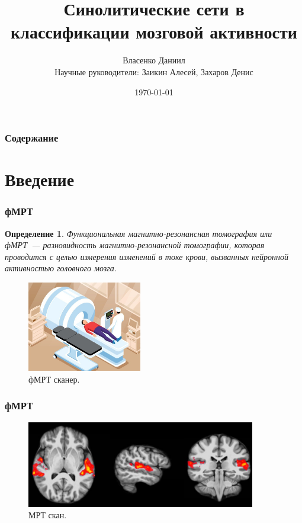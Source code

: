\documentclass{beamer}
\newtheorem{definition_}{Определение}
\begin{document}
	\title{Синолитические сети в классификации мозговой активности}  
	\author{Власенко Даниил\\
	{\footnotesize Научные руководители: Заикин Алесей, Захаров Денис}
	}
	\date{\today} 
	
	\begin{frame}
		\titlepage
	\end{frame}

	\begin{frame}
		\frametitle{Содержание}
		\tableofcontents
	\end{frame} 

	\section{Введение} 
	\begin{frame}
		\frametitle{фМРТ} 
							
		\begin{definition_}
			Функциональная магнитно-резонансная томография или фМРТ~--- разновидность магнитно-резонансной томографии, которая проводится с целью измерения изменений в токе крови, вызванных нейронной активностью головного мозга. 
		\end{definition_}
	
		\begin{figure}
			\includegraphics[width=5cm]{../images/fmri_1.jpeg}
			\caption{фМРТ сканер.} 
			\label{fg:1}
		\end{figure}		
	\end{frame}

	\begin{frame} 
		\frametitle{фМРТ}
		\begin{figure}
			\includegraphics[width=10cm]{../images/fmri_2.png}
			\caption{МРТ скан.} 
			\label{fg:2}
		\end{figure}
	\end{frame}
\end{document}
